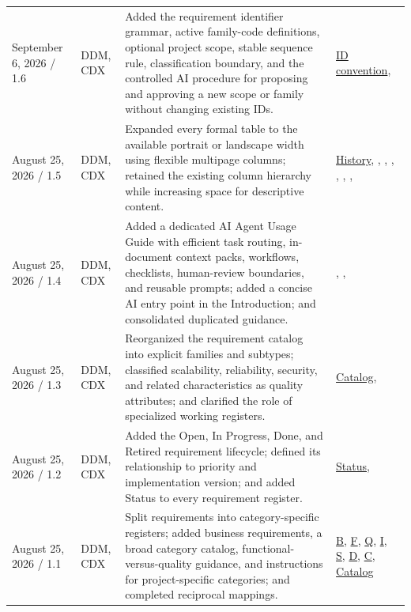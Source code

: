\begin{tabularx}{\linewidth}{L{3.1cm}L{2.2cm}YL{2.0cm}}
September 6, 2026 / 1.6 & DDM, CDX & Added the requirement identifier grammar, active family-code definitions, optional project scope, stable sequence rule, classification boundary, and the controlled AI procedure for proposing and approving a new scope or family without changing existing IDs. & \hyperref[Table:RequirementIdentifierConvention]{ID convention}, \\
August 25, 2026 / 1.5 & DDM, CDX & Expanded every formal table to the available portrait or landscape width using flexible multipage columns; retained the existing column hierarchy while increasing space for descriptive content. & \hyperref[Table:DocumentHistory]{History}, , , , , , , \\
August 25, 2026 / 1.4 & DDM, CDX & Added a dedicated AI Agent Usage Guide with efficient task routing, in-document context packs, workflows, checklists, human-review boundaries, and reusable prompts; added a concise AI entry point in the Introduction; and consolidated duplicated guidance. & , , \\
August 25, 2026 / 1.3 & DDM, CDX & Reorganized the requirement catalog into explicit families and subtypes; classified scalability, reliability, security, and related characteristics as quality attributes; and clarified the role of specialized working registers. & \hyperref[Table:RequirementCategoryCatalog]{Catalog}, \\
August 25, 2026 / 1.2 & DDM, CDX & Added the Open, In Progress, Done, and Retired requirement lifecycle; defined its relationship to priority and implementation version; and added Status to every requirement register. & \hyperref[Table:RequirementStatusDefinitions]{Status}, \\
August 25, 2026 / 1.1 & DDM, CDX & Split requirements into category-specific registers; added business requirements, a broad category catalog, functional-versus-quality guidance, and instructions for project-specific categories; and completed reciprocal mappings. & \hyperref[Table:BusinessRequirements]{B}, \hyperref[Table:FunctionalRequirements]{F}, \hyperref[Table:QualityRequirements]{Q}, \hyperref[Table:InterfaceRequirements]{I}, \hyperref[Table:SecurityRequirements]{S}, \hyperref[Table:DataRequirements]{D}, \hyperref[Table:ConstraintRequirements]{C}, \hyperref[Table:RequirementCategoryCatalog]{Catalog}\\

\end{tabularx}
